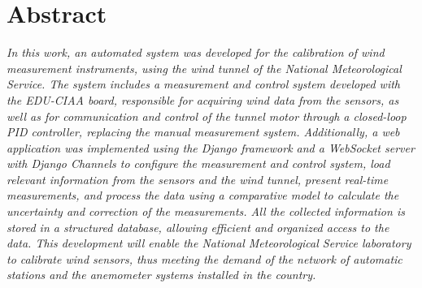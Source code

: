 \chapter*{Abstract}
\textit{In this work, an automated system was developed for the calibration of wind measurement instruments, using the wind tunnel of the National Meteorological Service. The system includes a measurement and control system developed with the EDU-CIAA board, responsible for acquiring wind data from the sensors, as well as for communication and control of the tunnel motor through a closed-loop PID controller, replacing the manual measurement system. Additionally, a web application was implemented using the Django framework and a WebSocket server with Django Channels to configure the measurement and control system, load relevant information from the sensors and the wind tunnel, present real-time measurements, and process the data using a comparative model to calculate the uncertainty and correction of the measurements. All the collected information is stored in a structured database, allowing efficient and organized access to the data. This development will enable the National Meteorological Service laboratory to calibrate wind sensors, thus meeting the demand of the network of automatic stations and the anemometer systems installed in the country.}